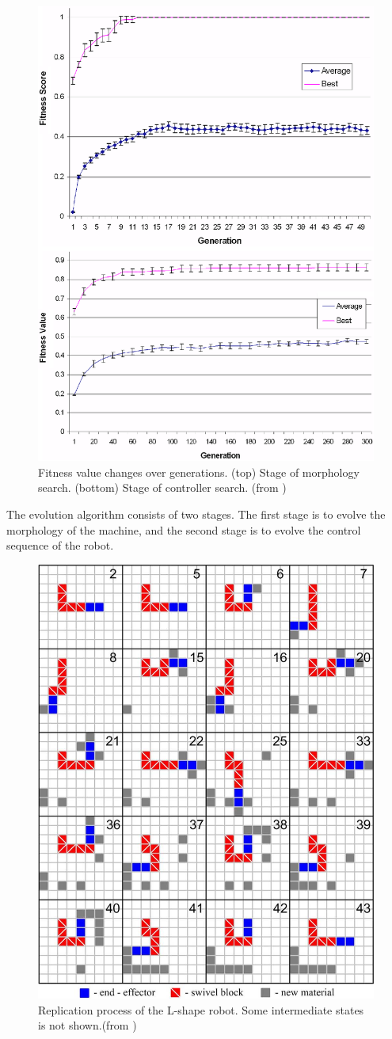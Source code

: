 \documentclass[12pt,twoside]{article}
\theoremstyle{plain}
\theoremstyle{definition}
\theoremstyle{remark}
\begin{document}
\begin{figure}[t]
	 \centerline{\includegraphics[width=.6\textwidth]{zykov-280}}
	 {\caption{Fitness value changes over generations. (top) Stage of morphology search. (bottom) Stage of controller search. (from \cite{zykov_evolved_2007})}
	 \label{fig:fitness}}
\end{figure}

The evolution algorithm consists of two stages. The first stage is to evolve the morphology of the machine, and the second stage is to evolve the control sequence of the robot.

\begin{figure}[t]
	 \centerline{\includegraphics[width=.6\textwidth]{zykov-279}}
	 {\caption{Replication process of the L-shape robot. Some intermediate states is not shown.(from \cite{zykov_evolved_2007})}
	 \label{fig:l-repproc}}
\end{figure}
\end{document}

